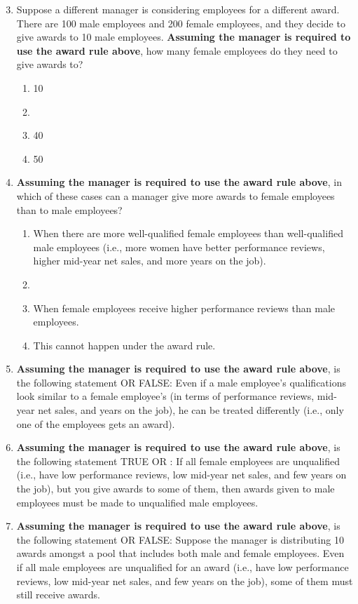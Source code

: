 \documentclass{article}
\newcommand{\correct}[1]{{\color{red}{#1}}}
\newcommand{\correct}[1]{{\color{red}{#1}}}
\begin{document}
\begin{enumerate}
    \setcounter{enumi}{2}
    \item Suppose a different manager is considering employees for a different award. There are 100 male employees and 200 female employees, and they decide to give awards to 10 male employees. \textbf{Assuming the manager is required to use the award rule above}, how many female employees do they need to give awards to?
    \begin{enumerate}
        \item 10
        \item \correct{20}
        \item 40
        \item 50
    \end{enumerate}
    \item \textbf{Assuming the manager is required to use the award rule above}, in which of these cases can a manager give more awards to female employees than to male employees?
    \begin{enumerate}
        \item When there are more well-qualified female employees than well-qualified male employees (i.e., more women have better performance reviews, higher mid-year net sales, and more years on the job). 
        \item \correct{When there are more female employees than male employees.}
        \item When female employees receive higher performance reviews than male employees.
        \item This cannot happen under the award rule.
    \end{enumerate}
    \item  \textbf{Assuming the manager is required to use the award rule above}, is the following statement \correct{TRUE} OR FALSE: Even if a male employee’s qualifications look similar to a female employee’s (in terms of performance reviews, mid-year net sales, and years on the job), he can be treated differently (i.e., only one of the employees gets an award).
    \item \textbf{Assuming the manager is required to use the award rule above}, is the following statement TRUE OR \correct{FALSE}: If all female employees are unqualified (i.e., have low performance reviews, low mid-year net sales, and few years on the job), but you give awards to some of them, then awards given to male employees must be made to unqualified male employees.
    \item \textbf{Assuming the manager is required to use the award rule above}, is the following statement \correct{TRUE} OR FALSE: Suppose the manager is distributing 10 awards amongst a pool that includes both male and female employees. Even if all male employees are unqualified for an award (i.e., have low performance reviews, low mid-year net sales, and few years on the job), some of them must still receive awards.

\end{enumerate}
\end{document}
